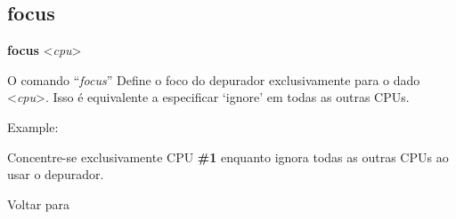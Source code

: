 \documentclass[letterpaper,10pt,brazil]{sphinxmanual}
\begin{document}
\subsection{focus}
\label{debugger/execution:debugger-command-focus}\label{debugger/execution:focus}
\begin{DUlineblock}{0em}
\item[]
\begin{DUlineblock}{\DUlineblockindent}
\item[] \textbf{focus} \textless{}\emph{cpu}\textgreater{}
\item[] 
\end{DUlineblock}
\item[] O comando ``\emph{focus}'' Define o foco do depurador exclusivamente para o dado \textless{}\emph{cpu}\textgreater{}. Isso é equivalente a especificar `ignore' em todas as outras CPUs.
\item[] 
\item[] Example:
\item[] 
\item[]
\begin{DUlineblock}{\DUlineblockindent}
\item[] 
\item[] 
\end{DUlineblock}
\item[] Concentre-se exclusivamente CPU \textbf{\#1} enquanto ignora todas as outras CPUs ao usar o depurador.
\item[] 
\item[] Voltar para {\hyperref[debugger/execution:debugger\string-execution\string-list]{}}
\end{DUlineblock}
\begin{quote}
\label{debugger/execution:debugger-command-ignore}\end{quote}
\end{document}
